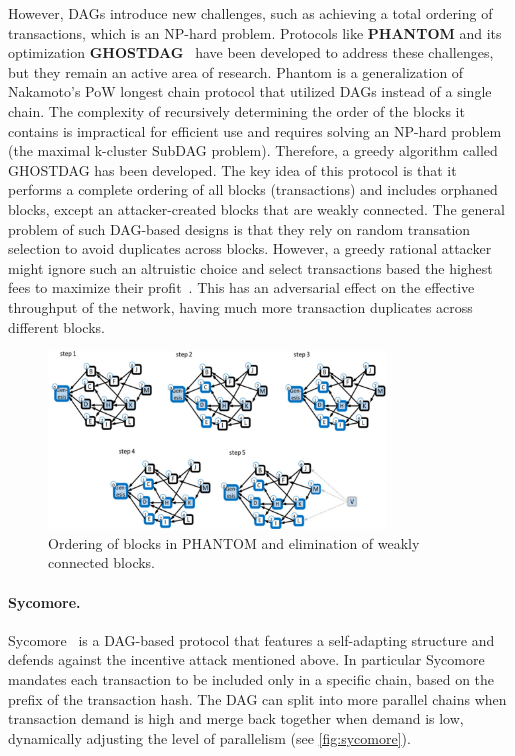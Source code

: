 However, DAGs introduce new challenges, such as achieving a total
ordering of transactions, which is an NP-hard problem. Protocols like
 \textbf{PHANTOM} and its optimization \textbf{GHOSTDAG}~\cite{sompolinsky2020phantom}  have been developed to address these challenges, but they remain an active area of research.
Phantom is a generalization of Nakamoto’s PoW longest chain protocol that utilized DAGs instead of a single chain. 
The complexity of recursively determining the order of the blocks it contains is impractical for efficient use and requires solving an NP-hard problem (the maximal k-cluster SubDAG problem). Therefore, a greedy algorithm called GHOSTDAG has been developed.
The key idea of this protocol is that it performs a complete ordering of all blocks (transactions) and includes orphaned blocks, except an attacker-created blocks that are weakly connected.
The general problem of such DAG-based designs is that they rely on random transation selection to avoid duplicates across blocks. 
However, a greedy rational attacker might ignore such an altruistic choice and select transactions based the highest fees to maximize their profit~\cite{perevsini2023incentive,perevsini2021dag}.
This has an adversarial effect on the effective throughput of the network, having much more transaction duplicates across different blocks.


\begin{figure}[t]
	\begin{center}
		\includegraphics[width=0.8\textwidth]{./figs/PHANTOM.png}
		\caption{Ordering of blocks in PHANTOM and elimination of weakly connected blocks.}		
		\label{fig:phantom}
	\end{center}	
\end{figure}
 

\paragraph{Sycomore.}\label{sycomore}
Sycomore~\cite{anceaume2018sycomore} is a DAG-based protocol that features a self-adapting
structure and defends against the incentive attack mentioned above. 
In particular Sycomore mandates each transaction to be included only in a specific chain, based on the prefix of the transaction hash.
The DAG can split into more parallel chains when transaction
demand is high and merge back together when demand is low, dynamically
adjusting the level of parallelism (see \autoref{fig:sycomore}).



